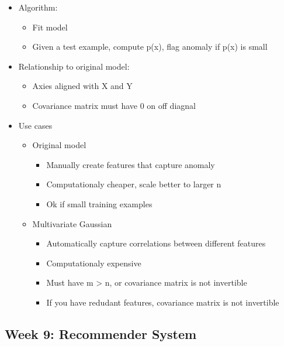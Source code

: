 \documentclass[]{article}
\providecommand{\tightlist}{%
  \setlength{\itemsep}{0pt}\setlength{\parskip}{0pt}}
\begin{document}
\begin{itemize}
\tightlist
\item
  Algorithm:

  \begin{itemize}
  \tightlist
  \item
    Fit model
  \item
    Given a test example, compute p(x), flag anomaly if p(x) is small
  \end{itemize}
\item
  Relationship to original model:

  \begin{itemize}
  \tightlist
  \item
    Axies aligned with X and Y
  \item
    Covariance matrix must have 0 on off diagnal
  \end{itemize}
\item
  Use cases

  \begin{itemize}
  \tightlist
  \item
    Original model

    \begin{itemize}
    \tightlist
    \item
      Manually create features that capture anomaly
    \item
      Computationaly cheaper, scale better to larger n
    \item
      Ok if small training examples
    \end{itemize}
  \item
    Multivariate Gaussian

    \begin{itemize}
    \tightlist
    \item
      Automatically capture correlations between different features
    \item
      Computationaly expensive
    \item
      Must have m \textgreater{} n, or covariance matrix is not
      invertible
    \item
      If you have redudant features, covariance matrix is not invertible
    \end{itemize}
  \end{itemize}
\end{itemize}

\hypertarget{week-9-recommender-system}{%
\subsection{Week 9: Recommender
System}\label{week-9-recommender-system}}
\end{document}
